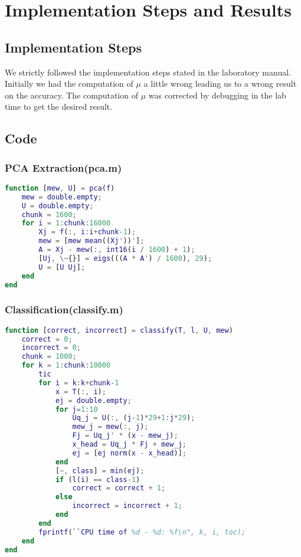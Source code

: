 \section{Implementation Steps and Results}
\label{sect:implementation-result}

\subsection{Implementation Steps}
\label{subsect:implementation_steps}
We strictly followed the implementation steps stated in the laboratory manual. Initially we had the computation of $\mu$ a little wrong leading us to a wrong result on the accuracy. The computation of $\mu$ was corrected by debugging in the lab time to get the desired result.

\subsection{Code}
\label{subsect:code}

\subsubsection{PCA Extraction(pca.m)}
\begin{lstlisting}[language=Matlab]
function [mew, U] = pca(f)
	mew = double.empty;
	U = double.empty;
	chunk = 1600;
	for i = 1:chunk:16000
		Xj = f(:, i:i+chunk-1);
		mew = [mew mean((Xj'))'];
		A = Xj - mew(:, int16(i / 1600) + 1);
		[Uj, \~{}] = eigs(((A * A') / 1600), 29);
		U = [U Uj];
	end
end
\end{lstlisting}

\subsubsection{Classification(classify.m)}
\begin{lstlisting}[language=Matlab]
function [correct, incorrect] = classify(T, l, U, mew)
	correct = 0;
	incorrect = 0;
	chunk = 1000;
	for k = 1:chunk:10000
		tic
		for i = k:k+chunk-1
			x = T(:, i);
			ej = double.empty;
			for j=1:10
				Uq_j = U(:, (j-1)*29+1:j*29);
				mew_j = mew(:, j);
				Fj = Uq_j' * (x - mew_j);
				x_head = Uq_j * Fj + mew_j;
				ej = [ej norm(x - x_head)];
			end
			[~, class] = min(ej);
			if (l(i) == class-1)
				correct = correct + 1;
			else
				incorrect = incorrect + 1;
			end
		end
		fprintf(``CPU time of %d - %d: %f\n", k, i, toc);
	end
end
\end{lstlisting}

